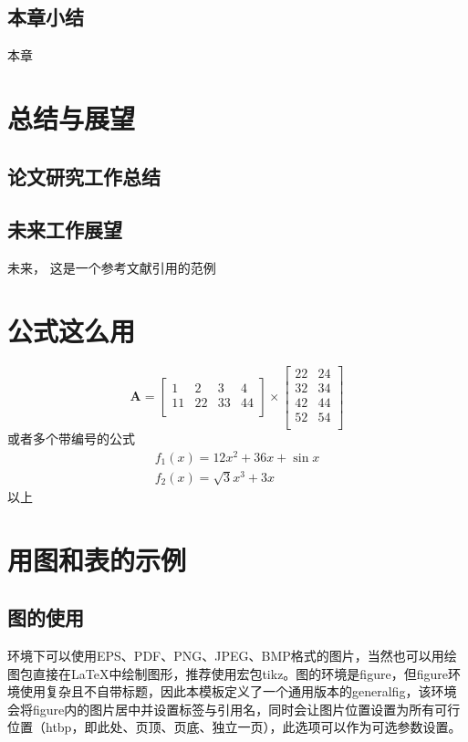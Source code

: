 \documentclass[supercite]{HustGraduPaper}
\begin{document}
\subsection{本章小结}

本章

\section{总结与展望}\label{sec:conclusion}

\subsection{论文研究工作总结}


\subsection{未来工作展望}

未来，
这是一个参考文献引用的范例\cite{5502350, liang2019large}


\section{公式这么用}

\begin{equation}
	\bm{A}=\begin{bmatrix}
		1  & 2  & 3  & 4  \\
		11 & 22 & 33 & 44 \\
	\end{bmatrix}
	\times\begin{bmatrix}
		22 & 24 \\
		32 & 34 \\
		42 & 44 \\
		52 & 54 \\
	\end{bmatrix}
\end{equation}
或者多个带编号的公式
\begin{eqnarray}
	f_1(x)=12x^2+36x+\sin x\\
	f_2(x)=\sqrt{3}{x^3+3x}
\end{eqnarray}
以上

\section{用图和表的示例}
\subsection{图的使用}
\XeLaTeX 环境下可以使用EPS、PDF、PNG、JPEG、BMP格式的图片，当然也可以用绘图包直接在\LaTeX 中绘制图形，推荐使用宏包tikz。图的环境是figure，但figure环境使用复杂且不自带标题，因此本模板定义了一个通用版本的generalfig，该环境会将figure内的图片居中并设置标签与引用名，同时会让图片位置设置为所有可行位置（htbp，即此处、页顶、页底、独立一页），此选项可以作为可选参数设置。
\end{document}
